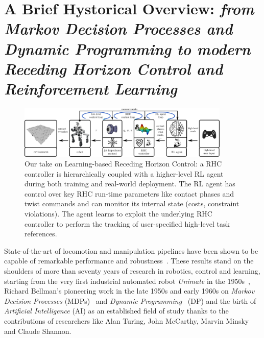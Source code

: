 \section{A Brief Hystorical Overview: \textnormal{\textit{from Markov Decision Processes and Dynamic Programming to modern Receding Horizon Control and Reinforcement Learning}}}
\begin{figure}[t]
	\centering
	\vspace{0.1cm}
	\includegraphics[width=0.9\textwidth]{imgs/learning_based_rhc.pdf}
	\caption{Our take on Learning-based Receding Horizon Control: a RHC controller is hierarchically coupled with a higher-level RL agent during both training and real-world deployment. The RL agent has control over key RHC run-time parameters like contact phases and twist commands and can monitor its internal state (costs, constraint violations). The agent learns to exploit the underlying RHC controller to perform the tracking of user-specified high-level task references.}
	\label{fig:lrhc_arch}
\end{figure}
State-of-the-art of locomotion and manipulation pipelines have been shown to be capable of remarkable performance and robustness~\cite{rl:schneider2023learning,rl:miki2024learning,web::atlas_grip_boston_dyn,web::lrhc_boston_dyn}. These results stand on the shoulders of more than seventy years of research in robotics, control and learning, starting from the very first industrial automated robot \textit{Unimate} in the 1950s~\cite{origins:xu2018fourth}, Richard Bellman's pioneering work in the late 1950s and early 1960s on \textit{Markov Decision Processes} (MDPs)~\cite{rl:bellman1957markovian} and \textit{Dynamic Programming}~\cite{rl:bellman1960dynamic} (DP) and the birth of \textit{Artificial Intelligence} (AI) as an established field of study thanks to the contributions of researchers like Alan Turing, John McCarthy, Marvin Minsky and Claude Shannon.
